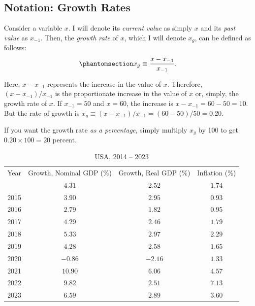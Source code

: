 \documentclass[
  letterpaper,
]{book}
\theoremstyle{plain}
\theoremstyle{remark}
\begin{document}
\subsection{Notation: Growth Rates}\label{sec-notngrowth}

Consider a variable \(x\). I will denote its \emph{current value} as
simply \(x\) and its \emph{past value} as \(x_{-1}\). Then, the
\emph{growth rate} of \(x\), which I will denote \(x_g\), can be defined
as follows: \begin{equation}\phantomsection\label{eq-growthrate}{
x_g\equiv\frac{x-x_{-1}}{x_{-1}}.
}\end{equation}

Here, \(x-x_{-1}\) represents the increase in the value of \(x\).
Therefore, \((x-x_{-1})/x_{-1}\) is the proportionate increase in the
value of \(x\) or, simply, the growth rate of \(x\). If \(x_{-1}=50\)
and \(x=60\), the increase is \(x-x_{-1}=60-50=10\). But the rate of
growth is \(x_g\equiv(x-x_{-1})/x_{-1}=(60-50)/50=0.20\).

If you want the growth rate \emph{as a percentage}, simply multiply
\(x_g\) by 100 to get \(0.20\times100=20\) percent.

\captionsetup{labelsep=none}

\begin{longtable}{cccc}

\caption{\label{tbl-growth-inflation}}

\tabularnewline

\caption*{
{\large USA, 2014 -- 2023}
} \\ 
\toprule
Year & Growth, Nominal GDP (\%) & Growth, Real GDP (\%) & Inflation (\%) \\ 
\midrule\addlinespace[2.5pt]
2014 & $4.31$ & $2.52$ & $1.74$ \\ 
2015 & $3.90$ & $2.95$ & $0.93$ \\ 
2016 & $2.79$ & $1.82$ & $0.95$ \\ 
2017 & $4.29$ & $2.46$ & $1.79$ \\ 
2018 & $5.33$ & $2.97$ & $2.29$ \\ 
2019 & $4.28$ & $2.58$ & $1.65$ \\ 
2020 & $-0.86$ & $-2.16$ & $1.33$ \\ 
2021 & $10.90$ & $6.06$ & $4.57$ \\ 
2022 & $9.82$ & $2.51$ & $7.13$ \\ 
2023 & $6.59$ & $2.89$ & $3.60$ \\ 
\bottomrule

\end{longtable}
\end{document}

